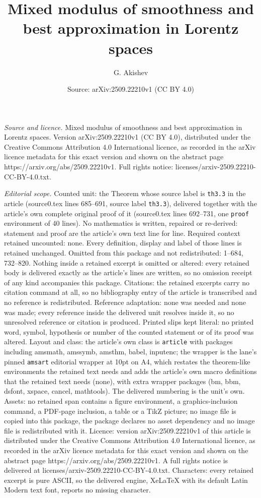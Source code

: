 \documentclass[10pt,a4paper]{amsart}
\title[Mixed modulus of smoothness and best approximation in Lorent]{Mixed modulus of smoothness and best approximation in Lorentz spaces}
\author{G. Akishev}
\date{Source: arXiv:2509.22210v1 (CC BY 4.0)}
\begin{document}
\maketitle

\noindent\emph{Source and licence.} Mixed modulus of smoothness and best approximation in Lorentz spaces. Version arXiv:2509.22210v1 (CC BY 4.0), distributed under the Creative Commons Attribution 4.0 International licence, as recorded in the arXiv licence metadata for this exact version and shown on the abstract page https://arxiv.org/abs/2509.22210v1. Full rights notice: licenses/arxiv-2509.22210-CC-BY-4.0.txt.\par\smallskip

\noindent\textit{Editorial scope.} Counted unit: the Theorem whose source label is \texttt{th3.3} in the article (source0.tex lines 685--691, source label \texttt{th3.3}), delivered together with the article's own complete original proof of it (source0.tex lines 692--731, one \texttt{proof} environment of 40 lines). No mathematics is written, repaired or re-derived: statement and proof are the article's own text line for line. Required context retained uncounted: none. Every definition, display and label of those lines is retained unchanged. Omitted from this package and not redistributed: 1--684, 732--820. Nothing inside a retained excerpt is omitted or altered: every retained body is delivered exactly as the article's lines are written, so no omission receipt of any kind accompanies this package. Citations: the retained excerpts carry no citation command at all, so no bibliography entry of the article is transcribed and no reference is redistributed. Reference adaptation: none was needed and none was made; every reference inside the delivered unit resolves inside it, so no unresolved reference or citation is produced. Printed slips kept literal: no printed word, symbol, hypothesis or number of the counted statement or of its proof was altered. Layout and class: the article's own class is \texttt{article} with packages including amsmath, amssymb, amsthm, babel, inputenc; the wrapper is the lane's pinned \texttt{amsart} editorial wrapper at 10pt on A4, which restates the theorem-like environments the retained text needs and adds the article's own macro definitions that the retained text needs (none), with extra wrapper packages (bm, bbm, dsfont, xspace, cancel, mathtools). The delivered numbering is the unit's own. Assets: no retained span contains a figure environment, a graphics-inclusion command, a PDF-page inclusion, a table or a TikZ picture; no image file is copied into this package, the package declares no asset dependency and no image file is redistributed with it. Licence: version arXiv:2509.22210v1 of this article is distributed under the Creative Commons Attribution 4.0 International licence, as recorded in the arXiv licence metadata for this exact version and shown on the abstract page https://arxiv.org/abs/2509.22210v1. A full rights notice is delivered at licenses/arxiv-2509.22210-CC-BY-4.0.txt. Characters: every retained excerpt is pure ASCII, so the delivered engine, XeLaTeX with its default Latin Modern text font, reports no missing character.
\end{document}
